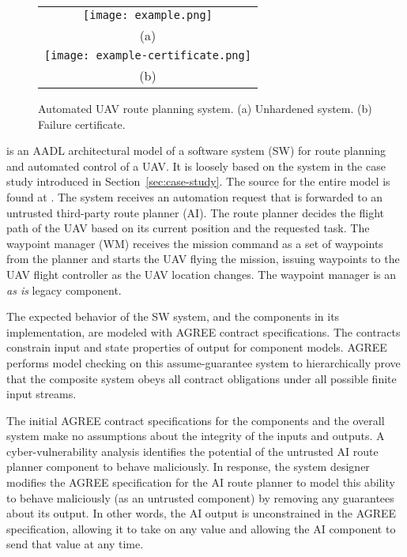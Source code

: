 \begin{figure*}
  \begin{center}
    \begin{tabular}{c}
      \texttt{[image: example.png]} \\
      (a) \\
      \texttt{[image: example-certificate.png]} \\
      (b)
    \end{tabular}
  \end{center}
\caption{Automated UAV route planning system. (a) Unhardened system. (b) Failure certificate.}
\label{fig:example}
\end{figure*}

 is an AADL architectural model of a software system (SW) for route planning and automated control of a UAV. It is loosely based on the system in the case study introduced in Section~\ref{sec:case-study}.  The source for the entire model is found at \cite{repo}. The system receives an automation request that is forwarded to an untrusted third-party route planner (AI).  The route planner decides the flight path of the UAV based on its current position and the requested task. The waypoint manager (WM) receives the mission command as a set of waypoints from the planner and starts the UAV flying the mission, issuing waypoints to the UAV flight controller as the UAV location changes. The waypoint manager is an \emph{as is} legacy component.

The expected behavior of the SW system, and the components in its implementation, are modeled with AGREE contract specifications. The contracts constrain input and state properties of output for component models. AGREE performs model checking on this assume-guarantee system to hierarchically prove that the composite system obeys all contract obligations under all possible finite input streams. 

The initial AGREE contract specifications for the components and the overall system make no assumptions about the integrity of the inputs and outputs. A cyber-vulnerability analysis identifies the potential of the untrusted AI route planner component to behave maliciously. In response, the system designer modifies the AGREE specification for the AI route planner to model this ability to behave maliciously
(as an untrusted component)
by removing any guarantees about its output.  In other words, the AI output is unconstrained in the AGREE specification, allowing it to take on any value and allowing the AI component to send that value at any time.

